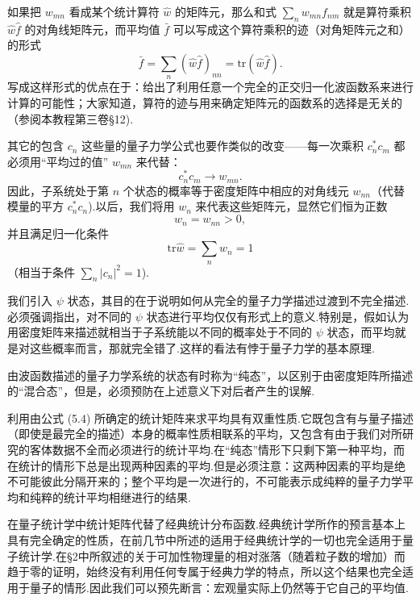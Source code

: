 如果把 $w_{mn}$ 看成某个统计算符 $\hat{w}$ 的矩阵元，那么和式 $\sum_n w_{mn}f_{nm}$ 就是算符乘积 $\hat{w}\hat{f}$ 的对角线矩阵元，而平均值 $\bar{f}$ 可以写成这个算符乘积的迹（对角矩阵元之和）的形式
\begin{equation}
  \bar{f}=\sum_n\left(\hat{w}\hat{f}\right)_{nn}
  =\mathrm{tr}\left(\hat{w}\hat{f}\right).
\end{equation}
写成这样形式的优点在于：给出了利用任意一个完全的正交归一化波函数系来进行计算的可能性；大家知道，算符的迹与用来确定矩阵元的函数系的选择是无关的（参阅本教程第三卷§12).

其它的包含 $c_n$ 这些量的量子力学公式也要作类似的改变——每一次乘积 $c_n^{*}c_m$ 都必须用“平均过的值” $w_{mn}$ 来代替：
\begin{equation*}
  c_n^{*}c_m\to w_{mn}.
\end{equation*}
因此，子系统处于第 $n$ 个状态的概率等于密度矩阵中相应的对角线元 $w_{nn}$（代替模量的平方 $c_n^{*}c_n$).以后，我们将用 $w_n$ 来代表这些矩阵元，显然它们恒为正数
\begin{equation}
  w_n=w_{nn}>0,
\end{equation}
并且满足归一化条件
\begin{equation}
  \mathrm{tr}\hat{w}=\sum_n w_n=1
\end{equation}
（相当于条件 $\sum_n|c_n|^2=1$).

我们引入 $\psi$ 状态，其目的在于说明如何从完全的量子力学描述过渡到不完全描述.必须强调指出，对不同的 $\psi$ 状态进行平均仅仅有形式上的意义.特别是，假如认为用密度矩阵来描述就相当于子系统能以不同的概率处于不同的 $\psi$ 状态，而平均就是对这些概率而言，那就完全错了.这样的看法有悖于量子力学的基本原理.

由波函数描述的量子力学系统的状态有时称为“纯态”，以区别于由密度矩阵所描述的“混合态”，但是，必须预防在上述意义下对后者产生的误解.

利用由公式 (5.4) 所确定的统计矩阵来求平均具有双重性质.它既包含有与量子描述（即使是最完全的描述）本身的概率性质相联系的平均，又包含有由于我们对所研究的客体数据不全而必须进行的统计平均.在“纯态”情形下只剩下第一种平均，而在统计的情形下总是出现两种因素的平均.但是必须注意：这两种因素的平均是绝不可能彼此分隔开来的；整个平均是一次进行的，不可能表示成纯粹的量子力学平均和纯粹的统计平均相继进行的结果.

在量子统计学中统计矩阵代替了经典统计分布函数.经典统计学所作的预言基本上具有完全确定的性质，在前几节中所述的适用于经典统计学的一切也完全适用于量子统计学.在§2中所叙述的关于可加性物理量的相对涨落（随着粒子数的增加）而趋于零的证明，始终没有利用任何专属于经典力学的特点，所以这个结果也完全适用于量子的情形.因此我们可以预先断言：宏观量实际上仍然等于它自己的平均值.

